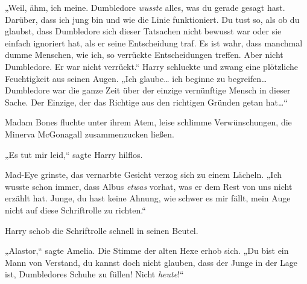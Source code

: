 „Weil, ähm, ich meine. Dumbledore \emph{wusste} alles, was du gerade gesagt hast. Darüber, dass ich jung bin und wie die Linie funktioniert. Du tust so, als ob du glaubst, dass Dumbledore sich dieser Tatsachen nicht bewusst war oder sie einfach ignoriert hat, als er seine Entscheidung traf. Es ist wahr, dass manchmal dumme Menschen, wie ich, so verrückte Entscheidungen treffen. Aber nicht Dumbledore. Er war nicht verrückt.“
Harry schluckte und zwang eine plötzliche Feuchtigkeit aus seinen Augen.
„Ich glaube… ich beginne zu begreifen… Dumbledore war die ganze Zeit über der einzige vernünftige Mensch in dieser Sache. Der Einzige, der das Richtige aus den richtigen Gründen getan hat…“

Madam Bones fluchte unter ihrem Atem, leise schlimme Verwünschungen, die Minerva McGonagall zusammenzucken ließen.

„Es tut mir leid,“ sagte Harry hilflos.

Mad-Eye grinste, das vernarbte Gesicht verzog sich zu einem Lächeln.
„Ich wusste schon immer, dass Albus \emph{etwas} vorhat, was er dem Rest von uns nicht erzählt hat. Junge, du hast keine Ahnung, wie schwer es mir fällt, mein Auge nicht auf diese Schriftrolle zu richten.“

Harry schob die Schriftrolle schnell in seinen Beutel.

„Alastor,“ sagte Amelia. Die Stimme der alten Hexe erhob sich. „Du bist ein Mann von Verstand, du kannst doch nicht glauben, dass der Junge in der Lage ist, Dumbledores Schuhe zu füllen! Nicht \emph{heute}!“

